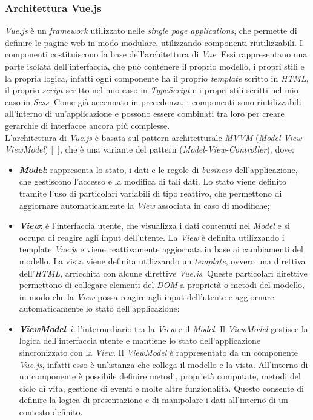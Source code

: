 \subsubsection{Architettura Vue.js}\label{subsubsec:architettura-vue-js}
\textit{Vue.js} è un \textit{framework} utilizzato nelle \textit{single page applications}, che permette di definire le pagine web in modo modulare, utilizzando componenti riutilizzabili.
I componenti costituiscono la base dell'architettura di \textit{Vue}. Essi rappresentano una parte isolata dell'interfaccia, che può contenere il proprio modello, i propri stili e la propria logica, infatti ogni componente ha il proprio
\textit{template} scritto in \textit{HTML}, il proprio \textit{script} scritto nel mio caso in \textit{TypeScript} e i propri stili scritti nel mio caso in \textit{Scss}.
Come già accennato in precedenza, i componenti sono riutilizzabili all'interno di un'applicazione e possono essere combinati tra loro per creare gerarchie di interfacce ancora più complesse.\\

L'architettura di \textit{Vue.js} è basata sul pattern architetturale \textit{MVVM} (\textit{Model-View-ViewModel}) [~\cite{site:vue-architettura}], che è una variante del pattern  (\textit{Model-View-Controller}), dove:
\begin{itemize}
  \item \textbf{\textit{Model}}: rappresenta lo stato, i dati e le regole di \textit{business} dell'applicazione, che gestiscono l'accesso e la modifica di tali dati. Lo stato viene definito tramite l'uso
  di particolari variabili di tipo reattivo, che permettono di aggiornare automaticamente la \textit{View} associata in caso di modifiche;
  \item \textbf{\textit{View}}: è l'interfaccia utente, che visualizza i dati contenuti nel \textit{Model} e si occupa di reagire agli input dell'utente. La \textit{View} è definita utilizzando i template \textit{Vue.js} e viene reattivamente aggiornata in base ai cambiamenti del modello. La vista viene definita utilizzando un \textit{template}, ovvero una direttiva dell'\textit{HTML}, arricchita con alcune direttive \textit{Vue.js}. 
  Queste particolari direttive permettono di collegare elementi del \textit{DOM} a proprietà o metodi del modello, in modo che la \textit{View} possa reagire agli input dell'utente e aggiornare automaticamente lo stato dell'applicazione;
  \item \textbf{\textit{ViewModel}}: è l'intermediario tra la \textit{View} e il \textit{Model}. Il \textit{ViewModel} gestisce la logica dell'interfaccia utente e mantiene lo stato dell'applicazione sincronizzato con la \textit{View}.
  Il \textit{ViewModel} è rappresentato da un componente \textit{Vue.js}, infatti esso è un'istanza che collega il modello e la vista. All'interno di un componente è possibile definire metodi, proprietà 
  computate, metodi del ciclo di vita, gestione di eventi e molte altre funzionalità. Questo consente di definire la logica di presentazione e di manipolare i dati all'interno di un contesto definito.
\end{itemize}

